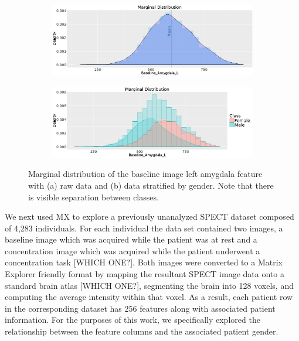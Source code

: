 \documentclass[twoside,leqno,twocolumn]{article}
\begin{document}
\begin{figure}[t]
	\centering
	\begin{subfigure}[t]{0.48\textwidth}
		\includegraphics[width=\textwidth,valign=t]{Figures/Spect_Gender/NonClass_Baseline_Amygdala_L.png}
		\subcaption{}
		\label{fig:FigSpecNoClassMarginal}
	\end{subfigure}
	\begin{subfigure}[t]{0.48\textwidth}
		\includegraphics[width=\textwidth,valign=t]{Figures/Spect_Gender/Baseline_Amygdala_L_Marginal.png}
		\subcaption{}
		\label{fig:FigSpecMarginal}
	\end{subfigure}
	\caption{Marginal distribution of the baseline image left amygdala feature with (a) raw data and (b) data stratified by gender. Note that there is visible separation between classes.}
	\label{fig:FigSpectMarginalCaption}
\end{figure}

We next used MX to explore a previously unanalyzed SPECT dataset composed of 4,283 individuals. For each individual the data set contained two images, a baseline image which was acquired while the patient was at rest and a concentration image which was acquired while the patient underwent a concentration task [WHICH ONE?]. Both images were converted to a Matrix Explorer friendly format by mapping the resultant SPECT image data onto a standard brain atlas [WHICH ONE?], segmenting the brain into 128 voxels, and computing the average intensity within that voxel. As a result, each patient row in the corresponding dataset has 256 features along with associated patient information. For the purposes of this work, we specifically explored the relationship between the feature columns and the associated patient gender. 
\end{document}
